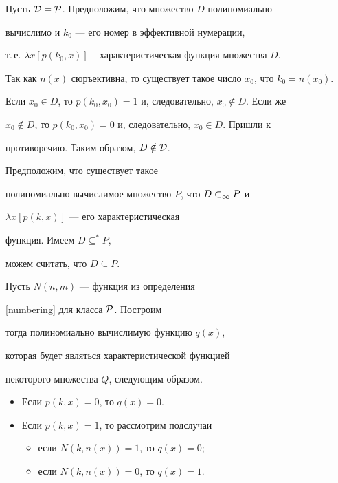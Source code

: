 \begin{pf}


Пусть $\cal{D}=\cal{P}$. Предположим, что множество $D$ полиномиально


вычислимо и $k_0$ --- его номер в эффективной нумерации, 


т.\,е. $\lambda x[p(k_0,x)]$ -- характеристическая функция множества $D$.





Так как $n(x)$ сюръективна, то существует такое число $x_0$, что $k_0=n(x_0)$.


Если $x_0\in D$, то $p(k_0,x_0)=1$ и, следовательно, $x_0\notin D$. Если же


$x_0\notin D$, то $p(k_0,x_0)=0$ и, следовательно, $x_0\in D$. Пришли к


противоречию. Таким образом, $D\notin\cal{D}$.





Предположим, что существует такое 


полиномиально вычислимое множество $P$, что ${D}\subset_\infty{P}$ и


$\lambda x[p(k,x)]$ --- его характеристическая 


функция. Имеем $D\subseteq^*P$,


можем считать, что $D\subseteq P$.





Пусть $N(n,m)$ --- функция из определения


\ref{numbering} для класса $\cal{P}$. Построим


тогда полиномиально вычислимую функцию $q(x)$,


которая будет являться характеристической функцией


некоторого множества $Q$, следующим образом.


\begin{itemize}


\item[1)] Если $p(k,x)=0$, то $q(x)=0$.


\item[2)] Если $p(k,x)=1$, то рассмотрим подслучаи


\begin{itemize}


\item[a)] если $N(k,n(x))=1$, то $q(x)=0$;


\item[b)] если $N(k,n(x))=0$, то $q(x)=1$.



\end{itemize}
\end{itemize}
\end{pf}
